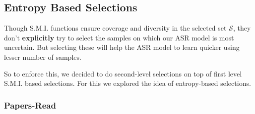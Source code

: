 \documentclass[12pt, a4paper, twoside]{article}
\begin{document}
\subsection{Entropy Based Selections}
Though S.M.I. functions ensure coverage and diversity in the selected set $\mathcal{S}$, they don't \textbf{explicitly} try to select the samples on which our ASR model is most uncertain. But selecting these will help the ASR model to learn quicker using lesser number of  samples. 

So to enforce this, we decided to do second-level selections on top of first level S.M.I. based selections. For this we explored the idea of entropy-based selections.
\subsubsection{Papers-Read}
\end{document}
